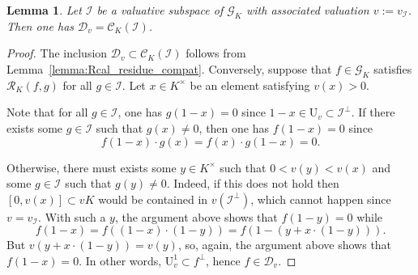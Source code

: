 \documentclass[12pt]{amsart}
\newcommand{\Urm}{\mathrm{U}}
\newcommand{\Ccal}{\mathcal{C}}
\newcommand{\Gcal}{\mathcal{G}}
\newcommand{\Rcal}{\mathcal{R}}
\newcommand{\Dcal}{\mathcal{D}}
\newcommand{\Ical}{\mathcal{I}}
\newtheorem{lemma}[theorem]{Lemma}
\theoremstyle{definition}
\begin{document}
\begin{lemma}\label{lemma:centralizer_valuative}
  Let $\Ical$ be a valuative subspace of $\Gcal_{K}$ with associated valuation $v := v_{\Ical}$.
  Then one has $\Dcal_{v} = \Ccal_{K}(\Ical)$.
\end{lemma}
\begin{proof}
  The inclusion $\Dcal_{v} \subset \Ccal_{K}(\Ical)$ follows from Lemma~\ref{lemma:Rcal_residue_compat}.
  Conversely, suppose that $f \in \Gcal_{K}$ satisfies $\Rcal_{K}(f,g)$ for all $g \in \Ical$.
  Let $x \in K^{\times}$ be an element satisfying $v(x) > 0$.

  Note that for all $g \in \Ical$, one has $g(1-x) = 0$ since $1-x \in \Urm_{v} \subset \Ical^{\perp}$.
  If there exists some $g \in \Ical$ such that $g(x) \neq 0$, then one has $f(1-x) = 0$ since
  \[ f(1-x) \cdot g(x) = f(x) \cdot g(1-x) = 0. \]

  Otherwise, there must exists some $y \in K^{\times}$ such that $0 < v(y) < v(x)$ and some $g \in \Ical$ such that $g(y) \neq 0$.
  Indeed, if this does not hold then $[0,v(x)] \subset vK$ would be contained in $v(\Ical^{\perp})$, which cannot happen since $v = v_{\Ical}$.
  With such a $y$, the argument above shows that $f(1-y) = 0$ while
  \[ f(1-x) = f((1-x) \cdot (1-y)) = f(1-(y + x \cdot (1-y))). \]
  But $v(y + x \cdot (1-y)) = v(y)$, so, again, the argument above shows that $f(1-x) = 0$.
  In other words, $\Urm_{v}^{1} \subset f^{\perp}$, hence $f \in \Dcal_{v}$.
\end{proof}
\end{document}
